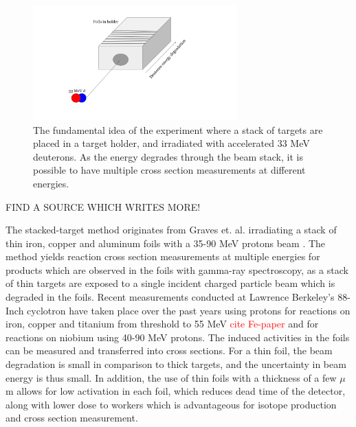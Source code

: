 \begin{figure}
    \centering
    \includegraphics[width=0.7\textwidth]{Experiment/Illustration_beamOnTarget.png}
    \caption{The fundamental idea of the experiment where a stack of targets are placed in a target holder, and irradiated with accelerated 33 MeV deuterons. As the energy degrades through the beam stack, it is possible to have multiple cross section measurements at different energies.}
    \label{fig:experiment_illustration}
\end{figure}

\noindent 

FIND A SOURCE WHICH WRITES MORE!

The stacked-target method originates from Graves et. al. irradiating a stack of thin iron, copper and aluminum foils with a 35-90 MeV protons beam \cite{Graves2016}. The method yields reaction cross section measurements at multiple energies for products which are observed in the foils with gamma-ray spectroscopy, as a stack of thin targets are exposed to a single incident charged particle beam which is degraded in the foils. Recent measurements conducted at Lawrence Berkeley's 88-Inch cyclotron have taken place over the past years using protons for reactions on iron, copper and titanium from threshold to 55 MeV  \textcolor{red}{cite Fe-paper}%
and for reactions on niobium using 40-90 MeV protons\cite{Voyles2018c}. The induced activities in the foils can be measured and transferred into cross sections. For a thin foil, the beam degradation is small in comparison to thick targets, and the uncertainty in beam energy is thus small. In addition, the use of thin foils with a thickness of a few $\mu$m allows for low activation in each foil, which reduces dead time of the detector, along with lower dose to workers which is advantageous for isotope production and cross section measurement\cite{Qaim2017c}. \\

